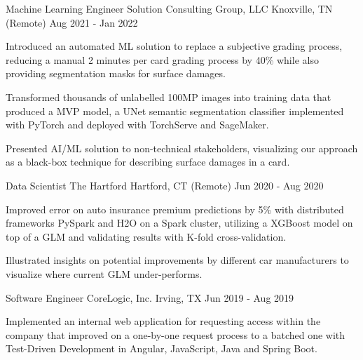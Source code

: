 \begin{cventries}
\cventry
{Machine Learning Engineer} %
{Solution Consulting Group, LLC} %
{Knoxville, TN (Remote)} %
{Aug 2021 - Jan 2022} %
{ %
\begin{cvitems}
\item {Introduced an automated ML solution to replace a subjective grading process, reducing a manual 2 minutes per card grading process by 40\% while also providing segmentation masks for surface damages.}
\item {Transformed thousands of unlabelled 100MP images into training data that produced a MVP model, a UNet semantic segmentation classifier implemented with PyTorch and deployed with TorchServe and SageMaker.}
\item {Presented AI/ML solution to non-technical stakeholders, visualizing our approach as a black-box technique for describing surface damages in a card.}
\end{cvitems}
}


\cventry
{Data Scientist} %
{The Hartford} %
{Hartford, CT (Remote)} %
{Jun 2020 - Aug 2020} %
{ %
\begin{cvitems}
\item {Improved error on auto insurance premium predictions by 5\% with distributed frameworks PySpark and H2O on a Spark cluster, utilizing a XGBoost model on top of a GLM and validating results with K-fold cross-validation.}
\item {Illustrated insights on potential improvements by different car manufacturers to visualize where current GLM under-performs.}
\end{cvitems} 
}


\cventry
{Software Engineer} %
{CoreLogic, Inc.} %
{Irving, TX} %
{Jun 2019 - Aug 2019} %
{ %
\begin{cvitems}
\item {Implemented an internal web application for requesting access within the company that improved on a one-by-one request process to a batched one with Test-Driven Development in Angular, JavaScript, Java and Spring Boot.}
\end{cvitems}
}


\end{cventries}

